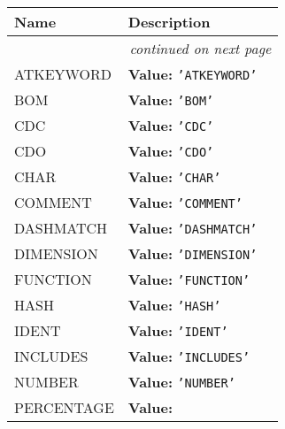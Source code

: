     \vspace{-1cm}
\hspace{\varindent}\begin{longtable}{|p{\varnamewidth}|p{\vardescrwidth}|l}
\cline{1-2}
\cline{1-2} \centering \textbf{Name} & \centering \textbf{Description}& \\
\cline{1-2}
\endhead\cline{1-2}\multicolumn{3}{r}{\small\textit{continued on next page}}\\\endfoot\cline{1-2}
\endlastfoot\raggedright A\-T\-K\-E\-Y\-W\-O\-R\-D\- & \raggedright \textbf{Value:} 
{\tt \texttt{'}\texttt{ATKEYWORD}\texttt{'}}&\\
\cline{1-2}
\raggedright B\-O\-M\- & \raggedright \textbf{Value:} 
{\tt \texttt{'}\texttt{BOM}\texttt{'}}&\\
\cline{1-2}
\raggedright C\-D\-C\- & \raggedright \textbf{Value:} 
{\tt \texttt{'}\texttt{CDC}\texttt{'}}&\\
\cline{1-2}
\raggedright C\-D\-O\- & \raggedright \textbf{Value:} 
{\tt \texttt{'}\texttt{CDO}\texttt{'}}&\\
\cline{1-2}
\raggedright C\-H\-A\-R\- & \raggedright \textbf{Value:} 
{\tt \texttt{'}\texttt{CHAR}\texttt{'}}&\\
\cline{1-2}
\raggedright C\-O\-M\-M\-E\-N\-T\- & \raggedright \textbf{Value:} 
{\tt \texttt{'}\texttt{COMMENT}\texttt{'}}&\\
\cline{1-2}
\raggedright D\-A\-S\-H\-M\-A\-T\-C\-H\- & \raggedright \textbf{Value:} 
{\tt \texttt{'}\texttt{DASHMATCH}\texttt{'}}&\\
\cline{1-2}
\raggedright D\-I\-M\-E\-N\-S\-I\-O\-N\- & \raggedright \textbf{Value:} 
{\tt \texttt{'}\texttt{DIMENSION}\texttt{'}}&\\
\cline{1-2}
\raggedright F\-U\-N\-C\-T\-I\-O\-N\- & \raggedright \textbf{Value:} 
{\tt \texttt{'}\texttt{FUNCTION}\texttt{'}}&\\
\cline{1-2}
\raggedright H\-A\-S\-H\- & \raggedright \textbf{Value:} 
{\tt \texttt{'}\texttt{HASH}\texttt{'}}&\\
\cline{1-2}
\raggedright I\-D\-E\-N\-T\- & \raggedright \textbf{Value:} 
{\tt \texttt{'}\texttt{IDENT}\texttt{'}}&\\
\cline{1-2}
\raggedright I\-N\-C\-L\-U\-D\-E\-S\- & \raggedright \textbf{Value:} 
{\tt \texttt{'}\texttt{INCLUDES}\texttt{'}}&\\
\cline{1-2}
\raggedright N\-U\-M\-B\-E\-R\- & \raggedright \textbf{Value:} 
{\tt \texttt{'}\texttt{NUMBER}\texttt{'}}&\\
\cline{1-2}
\raggedright P\-E\-R\-C\-E\-N\-T\-A\-G\-E\- & \raggedright \textbf{Value:} 

\end{longtable}
